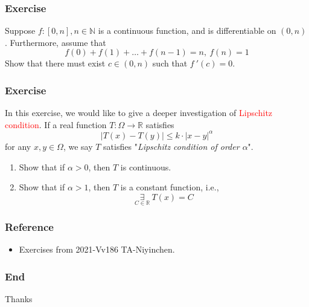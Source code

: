 \documentclass{beamer}
\begin{document}
\begin{frame}
    \frametitle{Exercise}
    Suppose $f:[0,n],n\in \mathbb{N}$ is a continuous function, and is differentiable on $(0,n)$. Furthermore, assume that
    \begin{equation*}
        f(0)+f(1)+\dots+f(n-1)=n,\ f(n)=1
    \end{equation*}
    Show that there must exist $c\in (0,n)$ such that $f~'(c)=0$.

\end{frame}

\begin{frame}
    \frametitle{Exercise}
    In this  exercise, we would like to give a deeper investigation of \textcolor{red}{Lipschitz condition}. If a real function $T:\Omega\rightarrow\mathbb{R}$
    satisfies
    \begin{equation*}
        |T(x)-T(y)|\leq k\cdot |x-y|^\alpha
    \end{equation*}
    for any $x,y\in \Omega$, we say $T$ satisfies "\emph{Lipschitz condition of order $\alpha$}".
    \begin{enumerate}
        \item Show that if $\alpha>0$, then $T$ is continuous.
        \item Show that if $\alpha>1$, then $T$ is a constant function, i.e.,
              \begin{equation*}
                  \underset{C\in \mathbb{R}}{\exists}\ T(x)=C
              \end{equation*}
    \end{enumerate}

\end{frame}


\begin{frame}
    \frametitle{Reference}
    \begin{itemize}
        \item Exercises from 2021-Vv186 TA-Niyinchen.
    \end{itemize}
\end{frame}
\begin{frame}
    \frametitle{End}
    \centering
    \LARGE{Thanks}


\end{frame}
\end{document}
